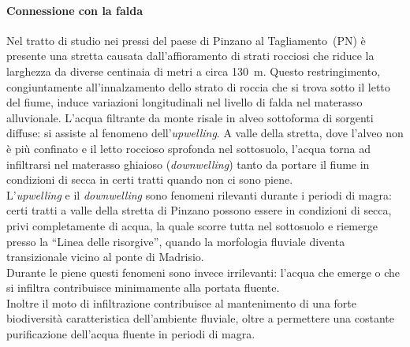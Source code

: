 \paragraph{Connessione con la falda}
Nel tratto di studio nei pressi del paese di Pinzano al Tagliamento~(PN) è presente una stretta causata dall'affioramento di strati rocciosi che riduce la larghezza da diverse centinaia di metri a circa \SI{130}{\m}.
Questo restringimento, congiuntamente all'innalzamento dello strato di roccia che si trova sotto il letto del fiume, induce variazioni longitudinali nel livello di falda nel materasso alluvionale.
L'acqua filtrante da monte risale in alveo sottoforma di sorgenti diffuse: si assiste al fenomeno dell'\emph{upwelling}.
A valle della stretta, dove l'alveo non è più confinato e il letto roccioso sprofonda nel sottosuolo, l'acqua torna ad infiltrarsi nel materasso ghiaioso (\emph{downwelling}) tanto da portare il fiume in condizioni di secca in certi tratti quando non ci sono piene.
\\
L'\emph{upwelling} e il \emph{downwelling} sono fenomeni rilevanti durante i periodi di magra: certi tratti a valle della stretta di Pinzano possono essere in condizioni di secca, privi completamente di acqua, la quale scorre tutta nel sottosuolo e riemerge presso la “Linea delle risorgive”, quando la morfologia fluviale diventa transizionale vicino al ponte di Madrisio.
\\
Durante le piene questi fenomeni sono invece irrilevanti: l'acqua che emerge o che si infiltra contribuisce minimamente alla portata fluente.
\\
Inoltre il moto di infiltrazione contribuisce al mantenimento di una forte biodiversità caratteristica dell'ambiente fluviale, oltre a permettere una costante purificazione dell'acqua fluente in periodi di magra.

